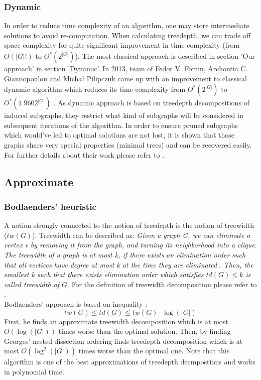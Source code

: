 \subsubsection{Dynamic}
In order to reduce time complexity of an algorithm, one may store intermediate solutions to avoid re-computation. When calculating treedepth, we can trade off space complexity for quite significant improvement in time complexity (from $O\left(\left|G\right|!\right)$ to $O^{*}\left(2^{\left|G\right|}\right)$). The most classical approach is described in section 'Our approach' in section 'Dynamic'. In 2013, team of Fedor V. Fomin, Archontia C. Giannopoulou and Michał Pilipczuk came up with an improvement to classical dynamic algorithm which reduces its time complexity from $O^{*}\left(2^{\left|G\right|}\right)$ to $O^{*}\left(1.9602^{\left|G\right|}\right)$ \cite{mimuw_td}. As dynamic approach is based on treedepth decompositions of induced subgraphs, they restrict what kind of subgraphs will be considered in subsequent iterations of the algorithm. In order to ensure pruned subgraphs which would've led to optimal solutions are not lost, it is shown that those graphs share very special properties (minimal trees) and can be recovered easily. For further details about their work please refer to \cite{mimuw_td}.
\subsection{Approximate}
\subsubsection{Bodlaenders' heuristic \cite{bodlaender_td_approx}}
A notion strongly connected to the notion of treedepth is the notion of treewidth ($tw\left(G\right)$). Treewidth can be described as:
\emph{Given a graph G, we can eliminate a vertex v by removing it from the graph, and turning its neighborhood into a clique. The treewidth of a graph is at most k, if there exists an elimination order such that all vertices have degree at most k at the time they are eliminated.\cite{tw_gpu}. Then, the smallest k such that there exists elimination order which satisfies $td(G)\leq k$ is called treewidth of $G$}. For the definition of treewidth decomposition please refer to \cite{tw_decomp}.\\
Bodlaenders' approach is based on inequality \cite{mimuw_td}\cite{bodlaender_td_approx}:
\begin{equation}
tw(G) \leq td(G) \leq tw(G)\cdot \log\left(\left|G\right|\right)
\end{equation}
First, he finds an approximate treewidth decomposition which is at most $O\left(\log\left(\left|G\right|\right)\right)$ times worse than the optimal solution.
Then, by finding Georges' nested dissection ordering \cite{george}\cite{bodlaender_td_approx} finds treedepth decomposition which is at most $O\left(\log^2\left(\left|G\right|\right)\right)$ times worse than the optimal one. Note that this algorithm is one of the best approximations of treedepth decmpostions and works in polynomial time.
